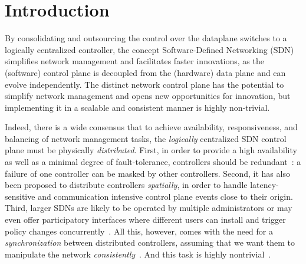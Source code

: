 \documentclass[conference]{sigcomm-alternate}
\begin{document}



\section{Introduction}\label{sec:intro}

By consolidating and outsourcing the control over the dataplane switches to a logically
centralized controller, the concept Software-Defined Networking (SDN)
simplifies network management and facilitates faster innovations, 
as the (software) control plane is decoupled from the (hardware) data
plane and can evolve independently.
%
The distinct network control plane has the potential to simplify
network management
and opens new opportunities for innovation,
but implementing it 
in a scalable and  consistent manner is highly non-trivial.

Indeed, there is a wide consensus that to achieve availability,
responsiveness, and balancing of network management tasks, 
the \emph{logically} centralized SDN
control plane must be physically \emph{distributed}.
First, in order to provide a high availability as well as a minimal degree of
fault-tolerance, controllers should be redundant~\cite{onix,stn,onos}: a failure
of one controller can be masked by other controllers. Second, it has also been proposed
to distribute controllers \emph{spatially}, in order to handle latency-sensitive and
communication intensive control plane events close to their origin.~\cite{devoflow,kandoo,jukka,disco}
Third, larger SDNs are likely to be operated by multiple administrators or may even offer
participatory interfaces where different users can install and trigger policy changes
concurrently~\cite{participatory,stn}.
All this, however, comes with the need for a \emph{synchronization}
between distributed controllers, assuming that we want them to
manipulate the network \emph{consistently}~\cite{cpc}.
And this task is highly nontrivial~\cite{cap-theorem}.
\end{document}
